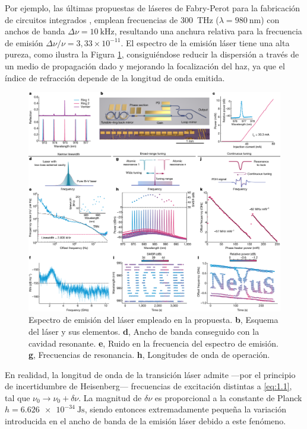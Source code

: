 Por ejemplo, las últimas propuestas de láseres de Fabry-Perot para la fabricación de circuitos integrados \autocite{tranExtendingSpectrumFully2022}, emplean frecuencias de \qty{300}{\THz} ($\lambda = \qty{980}{\nm}$) con anchos de banda $\Delta\nu = \qty{10}{\kHz}$, resultando una anchura relativa para la frecuencia de emisión $\Delta\nu/\nu = 3,33\times 10^{-11}$. El espectro de la emisión láser tiene una alta pureza, como ilustra la Figura \ref{fig:ch1_amplif}, consiguiéndose reducir la dispersión a través de un medio de propagación dado y mejorando la focalización del haz, ya que el índice de refracción depende de la longitud de onda emitida.

\begin{figure}[ht!]
    \centering
    \includegraphics[width=\textwidth]{Figuras/ch1_amplif.png}
    \caption{Espectro de emisión del láser empleado en la propuesta\autocite{tranExtendingSpectrumFully2022}. \textbf{b}, Esquema del láser y sus elementos. \textbf{d}, Ancho de banda conseguido con la cavidad resonante. \textbf{e}, Ruido en la frecuencia del espectro de emisión. \textbf{g}, Frecuencias de resonancia. \textbf{h}, Longitudes de onda de operación.}
    \label{fig:ch1_amplif}
\end{figure}

En realidad, la longitud de onda de la transición láser admite ---por el principio de incertidumbre de Heisenberg--- frecuencias de excitación distintas a \eqref{eq:1.1}, tal que $\nu_0\rightarrow\nu_0 + \delta\nu$. La magnitud de $\delta\nu$ es proporcional a la constante de Planck $h = \qty{6,626e-34}{\J\s}$, siendo entonces extremadamente pequeña la variación introducida en el ancho de banda de la emisión láser debido a este fenómeno. 

